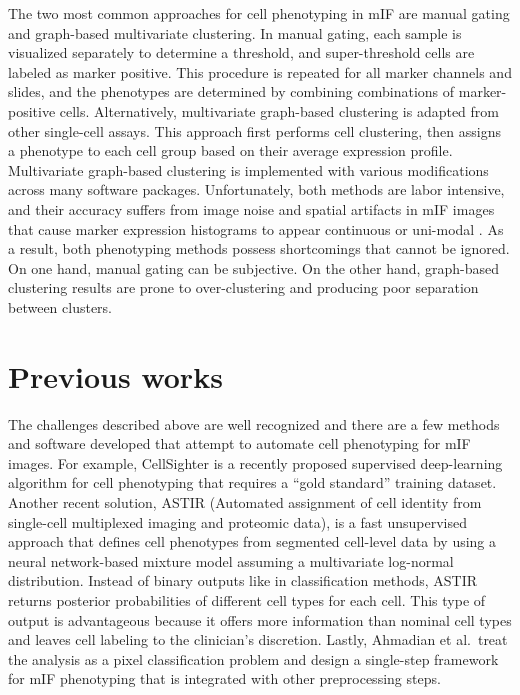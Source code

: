 \documentclass[
  letterpaper,
  DIV=11,
  numbers=noendperiod,
  oneside]{scrreprt}
\begin{document}
The two most common approaches for cell phenotyping in mIF are manual
gating and graph-based multivariate clustering. In manual gating, each
sample is visualized separately to determine a threshold, and
super-threshold cells are labeled as marker positive. This procedure is
repeated for all marker channels and slides, and the phenotypes are
determined by combining combinations of marker-positive cells.
Alternatively, multivariate graph-based clustering is adapted from other
single-cell assays. This approach first performs cell clustering, then
assigns a phenotype to each cell group based on their average expression
profile. Multivariate graph-based clustering is implemented with various
modifications across many software packages. Unfortunately, both methods
are labor intensive, and their accuracy suffers from image noise and
spatial artifacts in mIF images that cause marker expression histograms
to appear continuous or uni-modal . As a result, both phenotyping
methods possess shortcomings that cannot be ignored. On one hand, manual
gating can be subjective. On the other hand, graph-based clustering
results are prone to over-clustering and producing poor separation
between clusters.

\hypertarget{previous-works}{%
\section{Previous works}\label{previous-works}}

The challenges described above are well recognized and there are a few
methods and software developed that attempt to automate cell phenotyping
for mIF images. For example, CellSighter is a recently proposed
supervised deep-learning algorithm for cell phenotyping that requires a
``gold standard'' training dataset. Another recent solution, ASTIR
(Automated assignment of cell identity from single-cell multiplexed
imaging and proteomic data), is a fast unsupervised approach that
defines cell phenotypes from segmented cell-level data by using a neural
network-based mixture model assuming a multivariate log-normal
distribution. Instead of binary outputs like in classification methods,
ASTIR returns posterior probabilities of different cell types for each
cell. This type of output is advantageous because it offers more
information than nominal cell types and leaves cell labeling to the
clinician's discretion. Lastly, Ahmadian et al.~treat the analysis as a
pixel classification problem and design a single-step framework for mIF
phenotyping that is integrated with other preprocessing steps.
\end{document}
